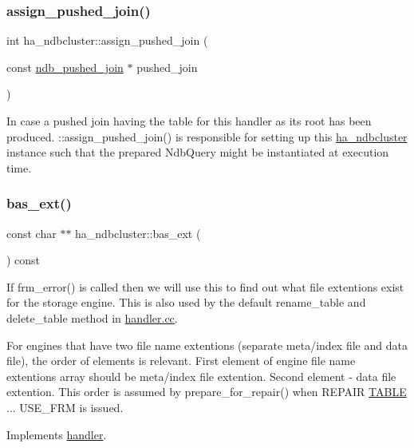 \subsubsection{\texorpdfstring{assign\+\_\+pushed\+\_\+join()}{assign\_pushed\_join()}}
{\footnotesize\ttfamily int ha\+\_\+ndbcluster\+::assign\+\_\+pushed\+\_\+join (\begin{DoxyParamCaption}\item[{const \mbox{\hyperlink{classndb__pushed__join}{ndb\+\_\+pushed\+\_\+join}} $\ast$}]{pushed\+\_\+join }\end{DoxyParamCaption})}

In case a pushed join having the table for this handler as its root has been produced. \+::assign\+\_\+pushed\+\_\+join() is responsible for setting up this \mbox{\hyperlink{classha__ndbcluster}{ha\+\_\+ndbcluster}} instance such that the prepared Ndb\+Query might be instantiated at execution time. \mbox{\label{classha__ndbcluster_ade5341ce688c24b5885145f821cdf249}} 
\subsubsection{\texorpdfstring{bas\+\_\+ext()}{bas\_ext()}}
{\footnotesize\ttfamily const char $\ast$$\ast$ ha\+\_\+ndbcluster\+::bas\+\_\+ext (\begin{DoxyParamCaption}{ }\end{DoxyParamCaption}) const\hspace{0.3cm}{\ttfamily [virtual]}}

If frm\+\_\+error() is called then we will use this to find out what file extentions exist for the storage engine. This is also used by the default rename\+\_\+table and delete\+\_\+table method in \mbox{\hyperlink{handler_8cc}{handler.\+cc}}.

For engines that have two file name extentions (separate meta/index file and data file), the order of elements is relevant. First element of engine file name extentions array should be meta/index file extention. Second element -\/ data file extention. This order is assumed by prepare\+\_\+for\+\_\+repair() when R\+E\+P\+A\+IR \mbox{\hyperlink{structTABLE}{T\+A\+B\+LE}} ... U\+S\+E\+\_\+\+F\+RM is issued. 

Implements \mbox{\hyperlink{classhandler_a748d5e5b6dbbb0681cbac2ad881505c9}{handler}}.

